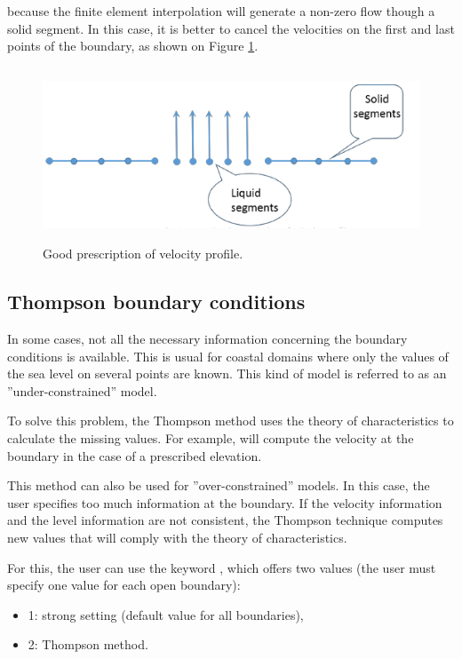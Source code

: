 because the finite element interpolation will generate a non-zero flow
though a solid segment.
In this case, it is better to cancel the velocities on the first and last points
of the boundary, as shown on Figure \ref{good:presc:vel:prof}.

\begin{figure}
\includegraphics*[width=5.24in, height=2.04in, keepaspectratio=false]{./graphics/good_profile.png}
\caption{Good prescription of velocity profile.}
\label{good:presc:vel:prof}
\end{figure}


\subsection{Thompson boundary conditions}

In some cases, not all the necessary information concerning the boundary
conditions is available.
This is usual for coastal domains where only the values of the sea level
on several points are known.
This kind of model is referred to as an ''under-constrained'' model.

To solve this problem, the Thompson method uses the theory of characteristics
to calculate the missing values.
For example,  will compute the velocity at the boundary in the case
of a prescribed elevation.

This method can also be used for ''over-constrained'' models.
In this case, the user specifies too much information at the boundary.
If the velocity information and the level information are not consistent,
the Thompson technique computes new values that will comply
with the theory of characteristics.

For this, the user can use the keyword ,
which offers two values (the user must specify one value for each open boundary):

\begin{itemize}
\item 1: strong setting (default value for all boundaries),

\item 2: Thompson method.
\end{itemize}

